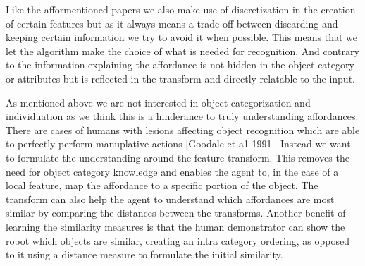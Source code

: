 Like the afformentioned papers we also make use of discretization in the
creation of certain features but as it always means a trade-off between
discarding and keeping certain information we try to avoid it when
possible. This means that we let the algorithm make the choice of what
is needed for recognition. And contrary to
\cite{Hermans:2011vz, JieSun:2010kv} the information explaining the
affordance is not hidden in the object category or attributes but is
reflected in the transform and directly relatable to the input.

As mentioned above we are not interested in object categorization and
individuation as we think this is a hinderance to truly understanding
affordances. There are cases of humans with lesions affecting object
recognition which are able to perfectly perform manuplative actions
{[}Goodale et a1 1991{]}. Instead we want to formulate the understanding
around the feature transform. This removes the need for object category
knowledge and enables the agent to, in the case of a local feature, map
the affordance to a specific portion of the object. The transform can
also help the agent to understand which affordances are most similar by
comparing the distances between the transforms. Another benefit of
learning the similarity measures is that the human demonstrator can show
the robot which objects are similar, creating an intra category
ordering, as opposed to it using a distance measure to formulate the
initial similarity.

\cite{Nikandrova:2015uu} \cite{Thomaz:2009uk} \cite{Griffith:2009cm}
\cite{Stark:2008bx}

